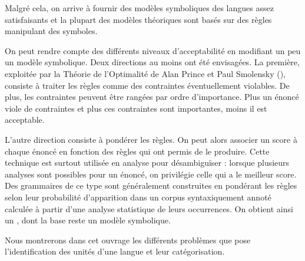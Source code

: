 Malgré cela, on arrive à fournir des modèles symboliques des langues assez satisfaisants et la plupart des modèles théoriques sont basés sur des règles manipulant des symboles.

On peut rendre compte des différents niveaux d’acceptabilité en modifiant un peu un modèle symbolique. Deux directions au moins ont été envisagées. La première, exploitée par la Théorie de l’Optimalité de Alan Prince et Paul Smolensky (\citeyear{PrinceSmolensky1993}), consiste à traiter les règles comme des contraintes éventuellement violables. De plus, les contraintes peuvent être rangées par ordre d’importance. Plus un énoncé viole de contraintes et plus ces contraintes sont importantes, moins il est acceptable.

L’autre direction consiste à pondérer les règles. On peut alors associer un score à chaque énoncé en fonction des règles qui ont permis de le produire. Cette technique est surtout utilisée en analyse pour désambiguïser : lorsque plusieurs analyses sont possibles pour un énoncé, on privilégie celle qui a le meilleur score. Des grammaires de ce type sont généralement construites en pondérant les règles selon leur probabilité d’apparition dans un corpus syntaxiquement annoté calculée à partir d’une analyse statistique de leurs occurrences. On obtient ainsi un , dont la base reste un modèle symbolique.

Nous montrerons dans cet ouvrage les différents problèmes que pose l’identification des unités d’une langue et leur catégorisation.\largerpage[2]

